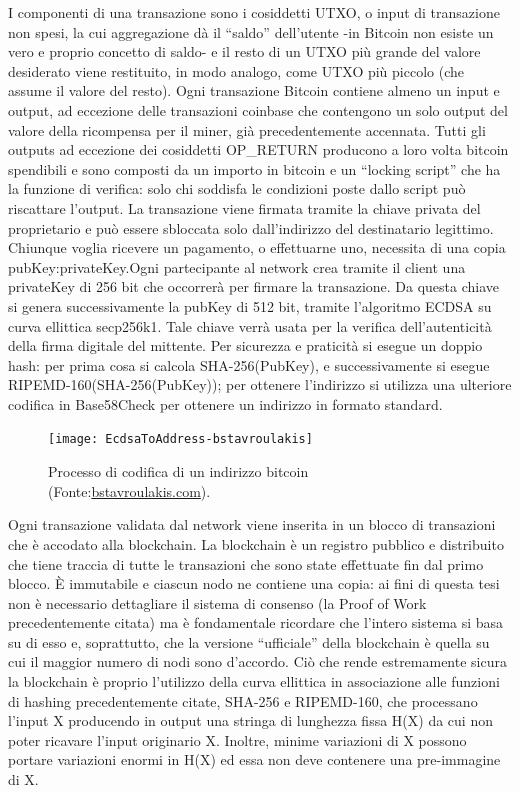 I componenti di una transazione sono i cosiddetti UTXO, o input di transazione non spesi, la cui aggregazione dà il “saldo” dell’utente -in Bitcoin non esiste un vero e proprio concetto di saldo- e il resto di un UTXO più grande del valore desiderato viene restituito, in modo analogo, come UTXO più piccolo (che assume il valore del resto). 
Ogni transazione Bitcoin contiene almeno un input e output, ad eccezione delle transazioni coinbase che contengono un solo output del valore della ricompensa per il miner, già precedentemente accennata. Tutti gli outputs ad eccezione dei cosiddetti OP\_RETURN producono a loro volta bitcoin spendibili e sono composti da un importo in bitcoin e un “locking script” che ha la funzione di verifica: solo chi soddisfa le condizioni poste dallo script può riscattare l’output. La transazione viene firmata tramite la chiave privata del proprietario e può essere sbloccata solo dall’indirizzo del destinatario legittimo.
Chiunque voglia ricevere un pagamento, o effettuarne uno, necessita di una copia pubKey:privateKey.Ogni partecipante al network crea tramite il client una privateKey di 256 bit che occorrerà per firmare la transazione.
Da questa chiave si genera successivamente la pubKey di 512 bit, tramite l’algoritmo ECDSA su curva ellittica secp256k1.
Tale chiave verrà usata per la verifica dell'autenticità della firma digitale del mittente.  
Per sicurezza e praticità si esegue un doppio hash: per prima cosa si calcola SHA-256(PubKey), e successivamente si esegue RIPEMD-160(SHA-256(PubKey)); per ottenere l'indirizzo si utilizza una ulteriore codifica in Base58Check per ottenere un indirizzo in formato standard.


\begin{figure}[h!]
\centering
\texttt{[image: EcdsaToAddress-bstavroulakis]}
\caption{Processo di codifica di un indirizzo bitcoin (Fonte:\url{bstavroulakis.com}).}
\label{fig:ecdsatoaddress-bstavroulakis}
\end{figure}


Ogni transazione validata dal network viene inserita in un blocco di transazioni che è accodato alla blockchain.
La blockchain è un registro pubblico e distribuito che tiene traccia di tutte le transazioni che sono state effettuate fin dal primo blocco. È immutabile e ciascun nodo ne contiene una copia: ai fini di questa tesi non è necessario dettagliare il sistema di consenso (la Proof of Work precedentemente citata) ma è fondamentale ricordare che l’intero sistema si basa su di esso e, soprattutto, che la versione “ufficiale” della blockchain è quella su cui il maggior numero di nodi sono d’accordo. Ciò che rende estremamente sicura la blockchain è proprio l’utilizzo della curva ellittica in associazione alle funzioni di hashing precedentemente citate, SHA-256 e RIPEMD-160, che processano l’input X producendo in output una stringa di lunghezza fissa H(X) da cui non poter ricavare l’input originario X. Inoltre, minime variazioni di X possono portare variazioni enormi in H(X) ed essa non deve contenere una pre-immagine di X.

